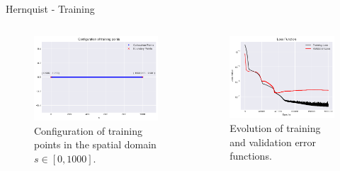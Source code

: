 \begin{frame}{Hernquist - Training}
\begin{columns}
    \column{\moit}
    \begin{figure}
        \centering
        \includegraphics[width=\textwidth]{imgs/training-points-hernquist.png}
        \caption{Configuration of training points in the spatial domain $s \in [0, 1000]$.}
        \label{fig:training-points-hernquist}
    \end{figure}
    \column{\moit}
    \begin{figure}
        \centering
        \includegraphics[width=\textwidth]{imgs/error-hernquist.png}
        \caption{Evolution of training and validation error functions.}
        \label{fig:losses-hernquist}
    \end{figure}
\end{columns}
\end{frame}

